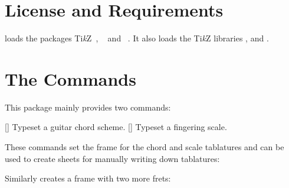 \documentclass[load-preamble+]{cnltx-doc}
\newcommand*\TikZ{Ti\textit{k}Z}
\begin{document}
\section{License and Requirements}

\license

\guitarchordschemes{} loads the packages \TikZ~\cite{pkg:pgf},
~\cite{pkg:etoolbox} and ~\cite{pkg:pgfopts}.  It
also loads the \TikZ{} libraries ,  and
.


\section{The Commands}
This package mainly provides two commands:
\begin{commands}
  []
    Typeset a guitar chord scheme.
  []
    Typeset a fingering scale.
\end{commands}
These commands set the frame for the chord and scale tablatures and can be used
to create sheets for manually writing down tablatures:
\begin{example}
  \chordscheme
\end{example}

Similarly  creates a frame with two more frets:
\begin{example}
  \scales
\end{example}
\end{document}
